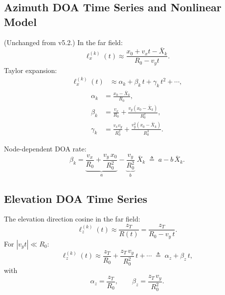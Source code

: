 \documentclass[11pt,a4paper]{article}
\begin{document}
\subsection{Azimuth DOA Time Series and Nonlinear Model}
\label{sec:doa_nonlinear}

(Unchanged from v5.2.)
In the far field:
\begin{equation}
  \ell_x^{(k)}(t) \approx \frac{x_0+v_x t-\bar{X}_k}{R_0-v_y t}.
  \label{eq:doa_ratio}
\end{equation}
Taylor expansion:
\begin{align}
  \ell_x^{(k)}(t) &\approx \alpha_k + \beta_k\,t + \gamma_k\,t^2
  + \cdots, \label{eq:doa_taylor}
\end{align}
\begin{align}
  \alpha_k &= \frac{x_0{-}\bar{X}_k}{R_0},
  \label{eq:alpha_k}\\
  \beta_k &= \frac{v_x}{R_0}
  + \frac{v_y(x_0{-}\bar{X}_k)}{R_0^2},
  \label{eq:beta_k}\\
  \gamma_k &= \frac{v_x v_y}{R_0^2}
  + \frac{v_y^2(x_0{-}\bar{X}_k)}{R_0^3}.
  \label{eq:gamma_k}
\end{align}

Node-dependent DOA rate:
\begin{equation}
  \beta_k = \underbrace{\frac{v_x}{R_0}
  + \frac{v_y\,x_0}{R_0^2}}_a
  - \underbrace{\frac{v_y}{R_0^2}}_b\;\bar{X}_k
  \;\triangleq\; a - b\,\bar{X}_k.
  \label{eq:beta_linear_in_Xk}
\end{equation}

\subsection{Elevation DOA Time Series}
\label{sec:elev_doa_timeseries}

The elevation direction cosine in the far field:
\begin{equation}
  \ell_z^{(k)}(t) \approx \frac{z_T}{R(t)}
  = \frac{z_T}{R_0 - v_y\,t}.
  \label{eq:lz_time}
\end{equation}
For $|v_y t|\ll R_0$:
\begin{equation}
  \ell_z^{(k)}(t) \approx \frac{z_T}{R_0}
  + \frac{z_T\,v_y}{R_0^2}\,t + \cdots
  \;\triangleq\; \alpha_z + \beta_z\,t,
  \label{eq:lz_taylor}
\end{equation}
with
\begin{equation}
  \alpha_z = \frac{z_T}{R_0},\qquad
  \beta_z = \frac{z_T\,v_y}{R_0^2}.
  \label{eq:lz_coeffs}
\end{equation}
\end{document}
